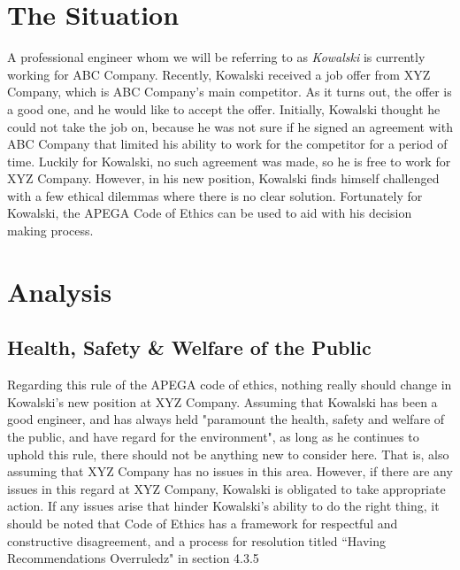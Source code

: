 \documentclass[letterpaper,12pt]{article}
\begin{document}
\section{The Situation}
A professional engineer whom we will be referring to as \textit{Kowalski} is currently working for ABC Company.
Recently, Kowalski received a job offer from XYZ Company, which is ABC Company's main competitor. As it turns out,
the offer is a good one, and he would like to accept the offer. Initially, Kowalski thought he could not take 
the job on, because he was not sure if he signed an agreement with ABC Company that limited his ability to work for the
competitor for a period of time. Luckily for Kowalski, no such agreement was made, so he is free to work for XYZ Company.
However, in his new position, Kowalski finds himself challenged with a few ethical dilemmas where there is no clear solution.
Fortunately for Kowalski, the APEGA Code of Ethics can be used to aid with his decision making process. 


\section{Analysis}

\subsection{Health, Safety \& Welfare of the Public}
Regarding this rule of the APEGA code of ethics, nothing really should change in Kowalski's new position at XYZ Company.
Assuming that Kowalski has been a good engineer, and has always held "paramount the health, safety and welfare of the public, and have regard for the
environment"\cite{apegacode}, as long as he continues to uphold this rule, there should not be anything new to consider here. That is,
also assuming that XYZ Company has no issues in this area. However, if there are any issues in this regard at XYZ Company, Kowalski is obligated to take appropriate action.
If any issues arise that hinder Kowalski's ability to do the right thing, it should be noted that Code of Ethics has a framework for respectful and constructive disagreement, and a process for
resolution titled “Having Recommendations Overruledz" in section 4.3.5
\end{document}
